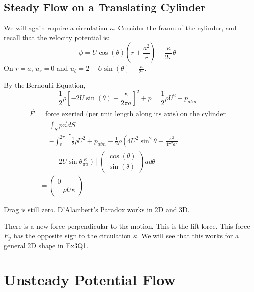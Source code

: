 \documentclass[../Main.tex]{subfiles}
\begin{document}
\subsection{Steady Flow on a Translating Cylinder}
We will again require a circulation $\kappa$. Consider the frame of the cylinder, and recall that the velocity potential is:
\begin{equation*}
    \phi = U\cos(\theta) \left(r + \frac{a^2}{r}\right) + \frac{\kappa}{2\pi}\theta
\end{equation*}
On $r = a$, $u_r = 0$ and $u_\theta = 2-U\sin(\theta) + \frac{\kappa}{2\pi}$.

By the Bernoulli Equation,
\begin{equation*}
    \frac12\rho \left[-2U\sin(\theta) + \frac{\kappa}{2\pi a}\right]^2 + p = \frac12 \rho U^2 + p_{atm}
\end{equation*}
\begin{align*}
    \vec{F} &= \text{force exerted (per unit length along its axis) on the cylinder} \\
    &= \int_S p \vec{n} dS \\
    &= -\int_{0}^{2\pi} \left[\frac12 \rho U^2 + p_{atm} - \frac12 \rho \left(4U^2 \sin^2{\theta} + \frac{\kappa^2}{4\pi^2 a^2} \right.\right. \\
    &\qquad\left.\left. - 2 U \sin{\theta} \frac{\kappa}{\pi a}\right)\right] \begin{pmatrix}\cos(\theta) \\ \sin(\theta)\end{pmatrix} a d\theta \\
    &= \begin{pmatrix}0 \\ -\rho U \kappa\end{pmatrix}
\end{align*}
\begin{remarks}
    \item Drag is still zero. D'Alambert's Paradox works in 2D and 3D.
    \item There is a new force perpendicular to the motion. This is the lift force. This force $F_y$ has the opposite sign to the circulation $\kappa$. We will see that this works for a general 2D shape in Ex3Q1.
\end{remarks}
\section{Unsteady Potential Flow}
\end{document}
